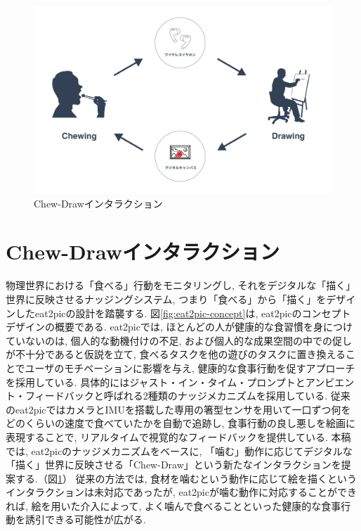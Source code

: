 \begin{figure}[t]
    \begin{center}
        \includegraphics[clip, width=1.0\hsize]{img/chew-draw.png}
        \caption{Chew-Drawインタラクション}
        \label{fig:chew-draw}
    \end{center}
\end{figure}

\section{Chew-Drawインタラクション}

物理世界における「食べる」行動をモニタリングし, それをデジタルな「描く」世界に反映させるナッジングシステム, つまり「食べる」から「描く」をデザインしたeat2picの設計を踏襲する. 図\ref{fig:eat2pic-concept}は, eat2picのコンセプトデザインの概要である. eat2picでは, ほとんどの人が健康的な食習慣を身につけていないのは, 個人的な動機付けの不足, および個人的な成果空間の中での促しが不十分であると仮説を立て, 食べるタスクを他の遊びのタスクに置き換えることでユーザのモチベーションに影響を与え, 健康的な食事行動を促すアプローチを採用している. 具体的にはジャスト・イン・タイム・プロンプトとアンビエント・フィードバックと呼ばれる2種類のナッジメカニズムを採用している. 従来のeat2picではカメラとIMUを搭載した専用の箸型センサを用いて一口ずつ何をどのくらいの速度で食べていたかを自動で追跡し, 食事行動の良し悪しを絵画に表現することで, リアルタイムで視覚的なフィードバックを提供している. 本稿では, eat2picのナッジメカニズムをベースに, 「噛む」動作に応じてデジタルな「描く」世界に反映させる「Chew-Draw」という新たなインタラクションを提案する.（図\ref{fig:chew-draw}） 従来の方法では, 食材を噛むという動作に応じて絵を描くというインタラクションは未対応であったが, eat2picが噛む動作に対応することができれば, 絵を用いた介入によって, よく噛んで食べることといった健康的な食事行動を誘引できる可能性が広がる.

